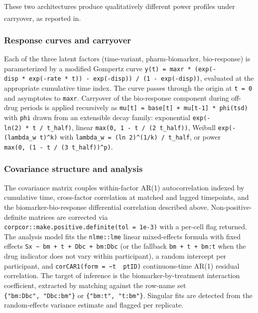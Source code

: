 \documentclass[
  11pt,
]{article}
\begin{document}
These two architectures produce qualitatively different power profiles
under carryover, as reported
in\textsuperscript{}.

\subsubsection{Response curves and
carryover}\label{response-curves-and-carryover}

Each of the three latent factors (time-variant, pharm-biomarker,
bio-response) is parameterized by a modified Gompertz curve
\texttt{y(t)\ =\ maxr\ *\ (exp(-disp\ *\ exp(-rate\ *\ t))\ -\ exp(-disp))\ /\ (1\ -\ exp(-disp))},
evaluated at the appropriate cumulative time index. The curve passes
through the origin at \texttt{t\ =\ 0} and asymptotes to \texttt{maxr}.
Carryover of the bio-response component during off-drug periods is
applied recursively as
\texttt{mu{[}t{]}\ =\ base{[}t{]}\ +\ mu{[}t-1{]}\ *\ phi(tsd)} with
\texttt{phi} drawn from an extensible decay family: exponential
\texttt{exp(-ln(2)\ *\ t\ /\ t\_half)}, linear
\texttt{max(0,\ 1\ -\ t\ /\ (2\ t\_half))}, Weibull
\texttt{exp(-(lambda\_w\ t)\^{}k)} with
\texttt{lambda\_w\ =\ (ln\ 2)\^{}(1/k)\ /\ t\_half}, or power
\texttt{max(0,\ (1\ -\ t\ /\ (3\ t\_half))\^{}p)}.

\subsubsection{Covariance structure and
analysis}\label{covariance-structure-and-analysis}

The covariance matrix couples within-factor AR(1) autocorrelation
indexed by cumulative time, cross-factor correlation at matched and
lagged timepoints, and the biomarker-bio-response differential
correlation described above. Non-positive-definite matrices are
corrected via \texttt{corpcor::make.positive.definite(tol\ =\ 1e-3)}
with a per-cell flag returned. The analysis model fits the
\texttt{nlme::lme} linear mixed-effects formula with fixed effects
\texttt{Sx\ \textasciitilde{}\ bm\ +\ t\ +\ Dbc\ +\ bm:Dbc} (or the
fallback \texttt{bm\ +\ t\ +\ bm:t} when the drug indicator does not
vary within participant), a random intercept per participant, and
\texttt{corCAR1(form\ =\ \textasciitilde{}t\ \textbar{}\ ptID)}
continuous-time AR(1) residual correlation. The target of inference is
the biomarker-by-treatment interaction coefficient, extracted by
matching against the row-name set \texttt{\{"bm:Dbc",\ "Dbc:bm"\}} or
\texttt{\{"bm:t",\ "t:bm"\}}. Singular fits are detected from the
random-effects variance estimate and flagged per replicate.
\end{document}

